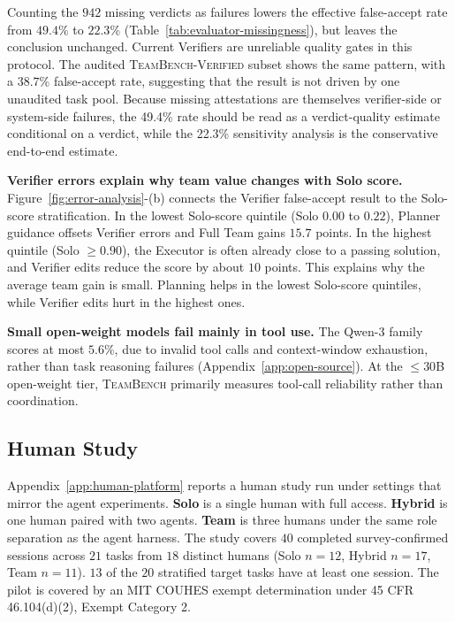 \documentclass{article}
\begin{document}
Counting the $942$ missing verdicts as failures lowers the effective false-accept rate from $49.4\%$ to $22.3\%$ (Table~\ref{tab:evaluator-missingness}), but leaves the conclusion unchanged. Current Verifiers are unreliable quality gates in this protocol. The audited \textsc{TeamBench-Verified} subset shows the same pattern, with a $38.7\%$ false-accept rate, suggesting that the result is not driven by one unaudited task pool. Because missing attestations are themselves verifier-side or system-side failures, the 49.4\% rate should be read as a verdict-quality estimate conditional on a verdict, while the 22.3\% sensitivity analysis is the conservative end-to-end estimate.

\textbf{Verifier errors explain why team value changes with Solo score.} Figure~\ref{fig:error-analysis}-(b) connects the Verifier false-accept result to the Solo-score stratification. In the lowest Solo-score quintile (Solo $0.00$ to $0.22$), Planner guidance offsets Verifier errors and Full Team gains $15.7$ points. In the highest quintile (Solo $\geq 0.90$), the Executor is often already close to a passing solution, and Verifier edits reduce the score by about $10$ points. This explains why the average team gain is small. Planning helps in the lowest Solo-score quintiles, while Verifier edits hurt in the highest ones.

\textbf{Small open-weight models fail mainly in tool use.} The Qwen-3 family scores at most $5.6\%$, due to invalid tool calls and context-window exhaustion, rather than task reasoning failures (Appendix~\ref{app:open-source}). At the $\leq 30$B open-weight tier,
\textsc{TeamBench} primarily measures tool-call reliability rather than coordination.

\subsection{Human Study}
\label{sec:human-study}

Appendix~\ref{app:human-platform} reports a human study run under settings that mirror the agent experiments. \textbf{Solo} is a single human with full access. \textbf{Hybrid} is one human paired with two agents. \textbf{Team} is three humans under the same role separation as the agent harness. The study covers $40$ completed survey-confirmed sessions across $21$ tasks from $18$ distinct humans (Solo $n{=}12$, Hybrid $n{=}17$, Team $n{=}11$). $13$ of the $20$ stratified target tasks have at least one session. The pilot is covered by an MIT COUHES exempt determination under 45 CFR 46.104(d)(2), Exempt Category 2.
\end{document}
